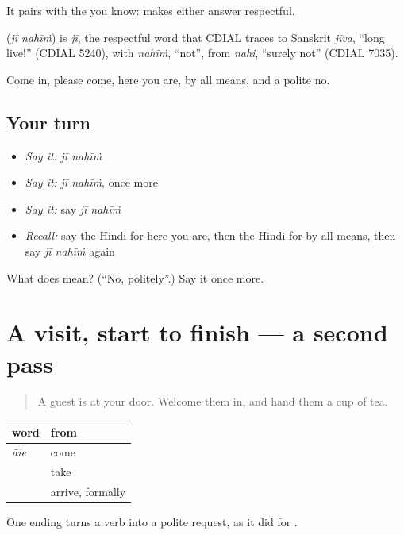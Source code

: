 It pairs with the \textbf{ } you know: \textbf{} makes either answer respectful.

\begin{cousinweb}
\textbf{ } (\emph{jī nahīṁ}) is \emph{jī}, the respectful word that CDIAL traces to Sanskrit \emph{jīva}, \textquotedblleft{}long live!\textquotedblright{} (CDIAL 5240), with \emph{nahīṁ}, \textquotedblleft{}not\textquotedblright{}, from \emph{nahi}, \textquotedblleft{}surely not\textquotedblright{} (CDIAL 7035).
\end{cousinweb}

\begin{grammarlens}[title={What you've built}]
Come in, please come, here you are, by all means, and a polite no.
\end{grammarlens}

\subsection*{Your turn}
\begin{itemize}
\raggedright
  \item \emph{Say it:} \emph{jī nahīṁ}
  \item \emph{Say it:} \emph{jī nahīṁ}, once more
  \item \emph{Say it:} say \emph{jī nahīṁ}
  \item \emph{Recall:} say the Hindi for here you are, then the Hindi for by all means, then say \emph{jī nahīṁ} again
\end{itemize}

\begin{tcolorbox}[breakable,colback=teal!4,colframe=teal!35!black,title={Before you move on}]
What does   mean? (\textquotedblleft{}No, politely\textquotedblright{}.) Say it once more.
\end{tcolorbox}
\section[(dialogue)]{A visit, start to finish — a second pass}

\label{lesson:HI-R115-second-pass-courtesy}



\begin{quote}
A guest is at your door. Welcome them in, and hand them a cup of tea.
\end{quote}

\begin{grammarlens}[title={Grammar Lens: the respectful ending}]
\noindent
\begin{tabularx}{\linewidth}{@{}>{\raggedright\arraybackslash}X>{\raggedright\arraybackslash}X@{}}
\toprule
\textbf{word} & \textbf{from} \\
\midrule
\emph{āie} & come \\
\textbf{\hi{लीजिए}} & take \\
\textbf{\hi{पधारिए}} & arrive, formally \\
\bottomrule
\end{tabularx}

One ending turns a verb into a polite request, as it did for \textbf{}.
\end{grammarlens}

